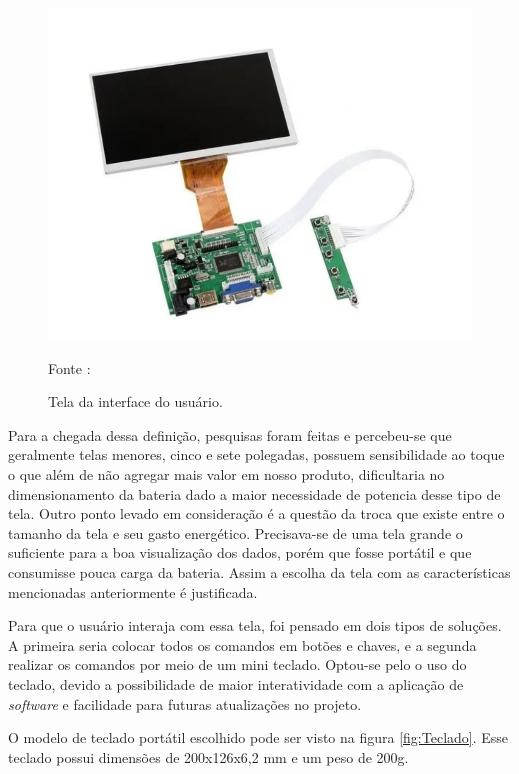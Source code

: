 \begin{figure}[H]
  \centering
  \includegraphics[scale=0.7]{figuras/TELAPI2.png}
  \caption{Tela da interface do usuário. }
  {\footnotesize Fonte : \cite{figura_Tela} } 
  \label{fig:Tela}
\end{figure}

Para a chegada dessa definição, pesquisas foram feitas e percebeu-se que geralmente telas menores, cinco e sete polegadas, possuem sensibilidade ao toque o que além de não agregar mais valor em nosso produto, dificultaria no dimensionamento da bateria dado a maior necessidade de potencia desse tipo de tela. Outro ponto levado em consideração é a questão da troca que existe entre o tamanho da tela e seu gasto energético. Precisava-se de uma tela grande o suficiente para a boa visualização dos dados, porém que fosse portátil e que consumisse pouca carga da bateria. Assim a escolha da tela com as características mencionadas anteriormente é justificada.

Para que o usuário interaja com essa tela, foi pensado em dois tipos de soluções. A primeira seria colocar todos os comandos em botões e chaves, e a segunda realizar os comandos por meio de um mini teclado. Optou-se pelo o uso do teclado, devido a possibilidade de maior interatividade com a aplicação de \textit{software} e facilidade para futuras atualizações no projeto. 

O modelo de teclado portátil escolhido pode ser visto na figura  \ref{fig:Teclado}. Esse teclado possui dimensões de 200x126x6,2 mm e um peso de 200g.

